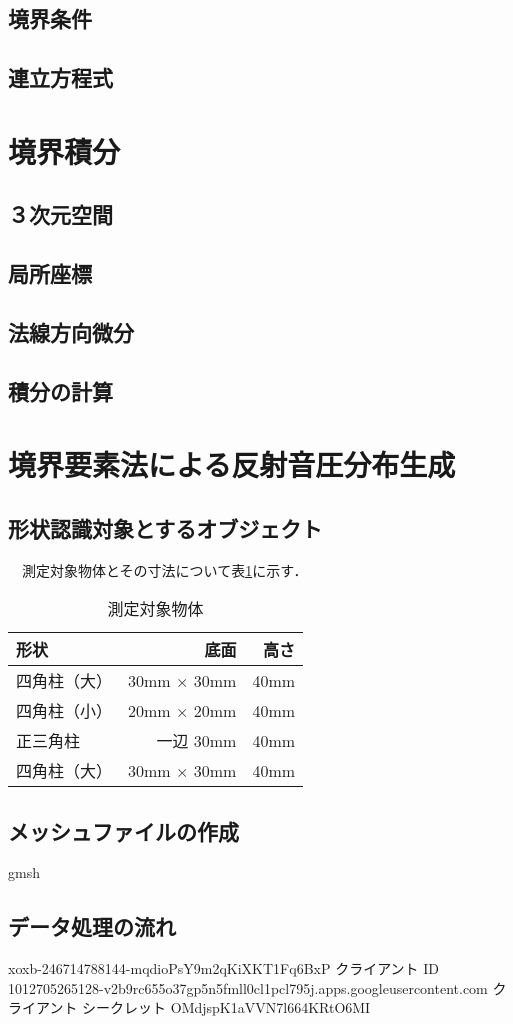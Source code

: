 \subsection{境界条件}

\subsection{連立方程式}



\section{境界積分}

\subsection{３次元空間}

\subsection{局所座標}

\subsection{法線方向微分}

\subsection{積分の計算}


\section{境界要素法による反射音圧分布生成}

\subsection{形状認識対象とするオブジェクト}
　測定対象物体とその寸法について表\ref{table:測定対象物体}に示す．

\begin{table}[htbp]
 \caption{測定対象物体}
 \label{table:測定対象物体}
 \centering
 \begin{tabular}{lrr}
  \hline
  形状      & 底面            & 高さ \\
  \hline
  四角柱（大） & 30mm × 30mm    & 40mm \\
  \hline
  四角柱（小） & 20mm × 20mm    & 40mm \\
  \hline
  正三角柱   & 一辺 30mm      & 40mm \\
  \hline
  四角柱（大） & 30mm × 30mm    & 40mm \\
  \hline

  \hline
 \end{tabular}
\end{table}

\subsection{メッシュファイルの作成}
gmsh
\subsection{データ処理の流れ}

xoxb-246714788144-mqdioPsY9m2qKiXKT1Fq6BxP
クライアント ID
1012705265128-v2b9rc655o37gp5n5fmll0cl1pcl795j.apps.googleusercontent.com
クライアント シークレット
OMdjspK1aVVN7l664KRtO6MI
